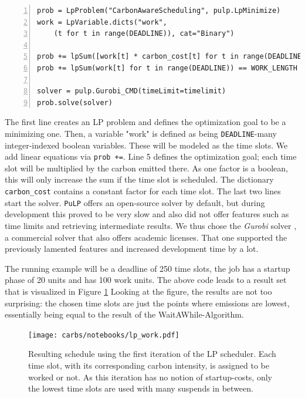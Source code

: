 \begin{minipage}{\linewidth}
\begin{lstlisting}[frame=single, numbers=left, caption={LP Implementation for basic scheduling}, label={list:lp_work}, basicstyle=\ttfamily, breaklines]
prob = LpProblem("CarbonAwareScheduling", pulp.LpMinimize)
work = LpVariable.dicts("work", 
    (t for t in range(DEADLINE)), cat="Binary")

prob += lpSum([work[t] * carbon_cost[t] for t in range(DEADLINE)]) 
prob += lpSum(work[t] for t in range(DEADLINE)) == WORK_LENGTH 

solver = pulp.Gurobi_CMD(timeLimit=timelimit)
prob.solve(solver)
\end{lstlisting}
\end{minipage}

The first line creates an LP problem and defines the optimization goal to be a minimizing one. 
Then, a variable "work" is defined as being \verb|DEADLINE|-many integer-indexed boolean variables. 
These will be modeled as the time slots. 
We add linear equations via \verb|prob +=|.
Line 5 defines the optimization goal; each time slot will be multiplied by the carbon emitted there. As one factor is a boolean, this will only increase the sum if the time slot is scheduled. The dictionary \verb|carbon_cost| contains a constant factor for each time slot.
The last two lines start the solver. 
\verb|PuLP| offers an open-source solver by default, but during development this proved to be very slow and also did not offer features such as time limits and retrieving intermediate results.
We thus chose the \emph{Gurobi} solver , a commercial solver that also offers academic licenses.
That one supported the previously lamented features and increased development time by a lot. 

The running example will be a deadline of 250 time slots, the job has a startup phase of 20 units and has 100 work units. 
The above code leads to a result set that is visualized in Figure \ref{fig:lp_work}
Looking at the figure, the results are not too surprising: the chosen time slots are just the points where emissions are lowest, essentially being equal to the result of the WaitAWhile-Algorithm.

\begin{figure}[H]
    \texttt{[image: carbs/notebooks/lp\_work.pdf]}
    \caption{Resulting schedule using the first iteration of the LP scheduler. Each time slot, with its corresponding carbon intensity, is assigned to be worked or not. As this iteration has no notion of startup-costs, only the lowest time slots are used with many suspends in between.}
    \label{fig:lp_work}
\end{figure}    


